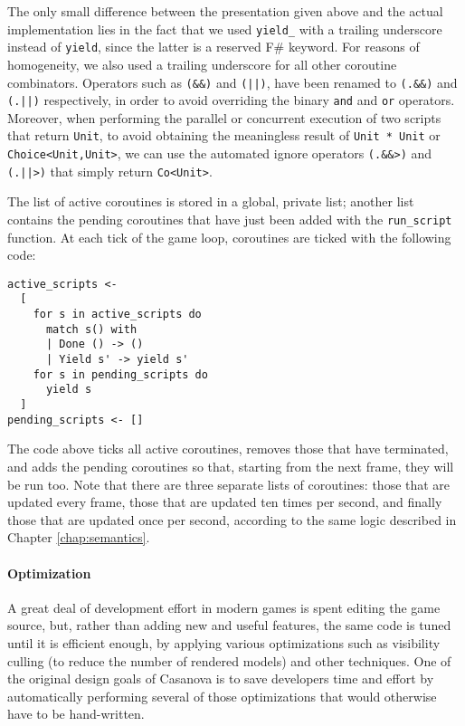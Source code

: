 The only small difference between the presentation given above and the actual implementation lies in the fact that we used \texttt{yield\_} with a trailing underscore instead of \texttt{yield}, since the latter is a reserved F\# keyword. For reasons of homogeneity, we also used a trailing underscore for all other coroutine combinators. Operators such as \texttt{(\&\&)} and \texttt{(||)}, have been renamed to \texttt{(.\&\&)} and \texttt{(.||)} respectively, in order to avoid overriding the binary \texttt{and} and \texttt{or} operators. Moreover, when performing the parallel or concurrent execution of two scripts that return \texttt{Unit}, to avoid obtaining the meaningless result of \texttt{Unit * Unit} or \texttt{Choice<Unit,Unit>}, we can use the automated ignore operators \texttt{(.\&\&>)} and \texttt{(.||>)} that simply return \texttt{Co<Unit>}.

The list of active coroutines is stored in a global, private list; another list contains the pending coroutines that have just been added with the \texttt{run\_script} function. At each tick of the game loop, coroutines are ticked with the following code:

\begin{lstlisting}
active_scripts <- 
  [ 
    for s in active_scripts do 
      match s() with
      | Done () -> ()
      | Yield s' -> yield s'
    for s in pending_scripts do
      yield s
  ]
pending_scripts <- []
\end{lstlisting}

The code above ticks all active coroutines, removes those that have terminated, and adds the pending coroutines so that, starting from the next frame, they will be run too. Note that there are three separate lists of coroutines: those that are updated every frame, those that are updated ten times per second, and finally those that are updated once per second, according to the same logic described in Chapter \ref{chap:semantics}.

\paragraph{Optimization}
A great deal of development effort in modern games is spent editing the game source, but, rather than adding new and useful features, the same code is tuned until it is efficient enough, by applying various optimizations such as visibility culling (to reduce the number of rendered models) and other techniques. One of the original design goals of Casanova is to save developers time and effort by automatically performing several of those optimizations that would otherwise have to be hand-written.

